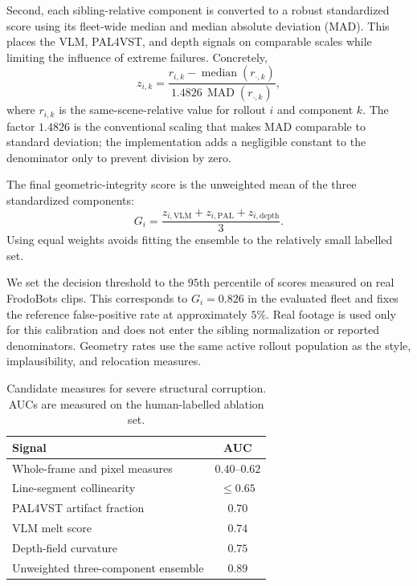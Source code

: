 \documentclass[letterpaper]{article} %
\begin{document}
Second, each sibling-relative component is converted to a robust standardized
score using its fleet-wide median and median absolute deviation (MAD). This
places the VLM, PAL4VST, and depth signals on comparable scales while limiting
the influence of extreme failures. Concretely,
\[
z_{i,k}
=
\frac{
r_{i,k}-\operatorname{median}(r_{\cdot,k})
}{
1.4826\,\operatorname{MAD}(r_{\cdot,k})
},
\]
where \(r_{i,k}\) is the same-scene-relative value for rollout \(i\) and
component \(k\). The factor \(1.4826\) is the conventional scaling that makes
MAD comparable to standard deviation; the implementation adds a negligible
constant to the denominator only to prevent division by zero.

The final geometric-integrity score is the unweighted mean of the three
standardized components:
\[
G_i
=
\frac{
z_{i,\mathrm{VLM}}
+
z_{i,\mathrm{PAL}}
+
z_{i,\mathrm{depth}}
}{3}.
\]
Using equal weights avoids fitting the ensemble to the relatively small
labelled set.

We set the decision threshold to the \(95\)th percentile of scores measured
on real FrodoBots clips. This corresponds to \(G_i=0.826\) in the evaluated
fleet and fixes the reference false-positive rate at approximately \(5\%\).
Real footage is used only for this calibration and does not enter the sibling
normalization or reported denominators. Geometry rates use the same active
rollout population as the style, implausibility, and relocation measures.

\begin{table}[t]
\centering
\small
\caption{
    Candidate measures for severe structural corruption. AUCs are measured on
    the human-labelled ablation set.
}
\label{tab:geometry_metric_auc}
\begin{tabular}{lc}
\toprule
Signal & AUC \\
\midrule
Whole-frame and pixel measures       & $0.40$--$0.62$ \\
Line-segment collinearity            & $\leq0.65$ \\
PAL4VST artifact fraction            & $0.70$ \\
VLM melt score                       & $0.74$ \\
Depth-field curvature                & $0.75$ \\
Unweighted three-component ensemble  & $\mathbf{0.89}$ \\
\bottomrule
\end{tabular}
\end{table}
\end{document}
